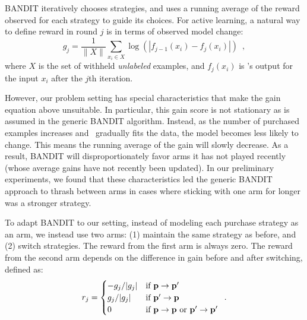 \documentclass[10pt, conference, compsocconf]{IEEEtran}
\newcommand{\sys}{\Call{Hal}{}} %
\begin{document}
BANDIT iteratively chooses strategies, and uses a running average of the reward
observed for each strategy to guide
its choices.  For active learning, a natural way to define reward in round $j$
is in terms of observed model change:
\begin{equation}
g_{j} = \frac{1}{\|X\|}\sum_{x_i \in X} \log{(|f_{j-1}(x_i) - f_{j}(x_i)|)}
\enspace ,
\end{equation}
where $X$ is the set of withheld {\em unlabeled} examples, and $f_{j}(x_i)$ is \sys's output for the 
input $x_i$ after the $j$th iteration.

However, our problem setting has special characteristics that make the gain equation above unsuitable.
In particular, this gain score is not stationary as is assumed in the generic BANDIT
algorithm. Instead,
as the number of purchased examples increases and \sys\ gradually fits the data,
the model becomes less likely to change.
This means the running average of the gain will slowly decrease.  As a result,
BANDIT will disproportionately favor arms it has not played recently
(whose average gains have not recently been updated).
In our preliminary experiments, we found that these characteristics
led the generic BANDIT approach to thrash
between arms in cases where sticking with one arm for longer was a stronger strategy.

To adapt BANDIT to our setting, instead of modeling each purchase strategy as
an arm, we instead use
two arms: (1) maintain the same strategy as before, and (2) switch strategies.
The reward from the first arm is always zero.  The reward from the second arm
depends on the difference in gain before and after switching, defined as:
\vspace{-0.1in}
\begin{equation}
\label{eq:reward}
    r_{j}=
\begin{cases}
   -g_{j}/|g_{j}| & \text{if } {\bf p}\rightarrow{\bf p'}\\
    g_{j}/|g_{j}| & \text{if } {\bf p'}\rightarrow{\bf p}\\
    0 & \text{if } {\bf p}\rightarrow{\bf p} \text{ or } {\bf p'}\rightarrow{\bf p'}\\
\end{cases}
\enspace .
\end{equation}
\end{document}
